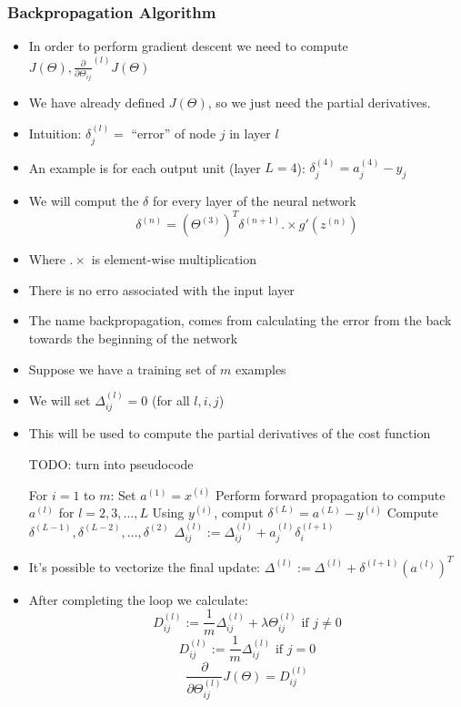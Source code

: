 \subsubsection{Backpropagation Algorithm}
\begin{itemize}[--]
	\item In order to perform gradient descent we need to compute $J(\Theta), \frac{\partial}{\partial\Theta_{ij}}^{(l)} J(\Theta)$
	\item We have already defined $J(\Theta)$, so we just need the partial derivatives.
	\item Intuition: $\delta_j^{(l)}=$ ``error'' of node $j$ in layer $l$
	\item An example is for each output unit (layer $L=4$): $\delta_{j}^{(4)}=a_{j}^{(4)} - y_{j}$
	\item We will comput the $\delta$ for every layer of the neural network
		$$\delta^{(n)} = (\Theta^{(3)})^{T}\delta^{(n+1)} .\times g'(z^{(n)})$$
	\item Where $.\times$ is element-wise multiplication
	\item There is no erro associated with the input layer
	\item The name backpropagation, comes from calculating the error from the back towards the beginning of the network

	\item Suppose we have a training set of $m$ examples
	\item We will set $\Delta_{ij}^{(l)}=0$ (for all $l,i,j$)
	\item This will be used to compute the partial derivatives of the cost function

	TODO: turn into pseudocode

	For $i=1$ to $m$:
		Set $a^{(1)}=x^{(i)}$
		Perform forward propagation to compute $a^{(l)}$ for $l=2,3,\ldots, L$
		Using $y^{(i)}$, comput $\delta^{(L)}=a^{(L)}-y^{(i)}$
		Compute $\delta^{(L-1)}, \delta^{(L-2)}, \ldots, \delta^{(2)}$
		$\Delta_{ij}^{(l)}:=\Delta_{ij}^{(l)} + a_j^{(l)} \delta_i^{(l+1)}$

	\item It's possible to vectorize the final update: $\Delta^{(l)} := \Delta^{(l)} + \delta^{(l+1)} (a^{(l)})^{T}$
	\item After completing the loop we calculate:
		$$D_{ij}^{(l)} := \frac{1}{m}\Delta_{ij}^{(l)} + \lambda\Theta_{ij}^{(l)} \text{ if } j\neq 0$$
		$$D_{ij}^{(l)} := \frac{1}{m}\Delta_{ij}^{(l)} \text{ if } j=0$$
		$$\frac{\partial}{\partial\Theta_{ij}^{(l)}} J(\Theta) = D_{ij}^{(l)}$$
\end{itemize}

